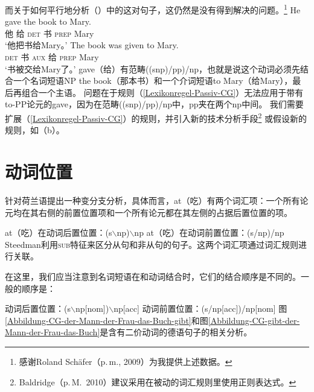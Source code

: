 \noindent
而关于如何平行地分析（）中的这对句子，这仍然是没有得到解决的问题。\footnote{%
  感谢Roland Sch\"{a}fer（p.\,m., 2009）为我提供上述数据。
}
\eal
\ex 
\gll He gave the book to Mary.\\
他 给 \textsc{det} 书 \textsc{prep} Mary\\
\glt `他把书给Mary。'
\ex 
\gll The book was given to Mary.\\
\textsc{det} 书  \textsc{aux} 给 \textsc{prep} Mary\\
\glt `书被交给Mary了。'
\zl
gave（给）有范畴((s\bs np)/pp)/np，也就是说这个动词必须先结合一个名词短语NP the book（那本书）和一个介词短语to Mary（给Mary），最后再组合一个主语。
问题在于规则（\ref{Lexikonregel-Passiv-CG}）无法应用于带有to-PP论元的gave，因为在范畴((s\bs np)/pp)/np中，pp夹在两个np中间。
我们需要扩展（\ref{Lexikonregel-Passiv-CG}）的规则，并引入新的技术分析手段\footnote{%
  Baldridge（p.\,M.\ 2010）建议采用在被动的词汇规则里使用正则表达式。
 }
或假设新的规则，如（b）。

\section{动词位置}
\label{sec-Verbstellung-CG-Steedman}

\mbox{}\citet[]{Steedman2000a-u}
针对荷兰语提出一种变分支分析，具体而言，at（吃）有两个词汇项：一个所有论元均在其右侧的前置位置项和一个所有论元都在其左侧的占据后置位置的项。

\eal
\ex at（吃）在动词后置位置：(s$\backslash$np)$\backslash$np
\ex at（吃）在动词前置位置：(s/np)/np
\zl
Steedman利用\textsc{sub}特征来区分从句和非从句的句子。这两个词汇项通过词汇规则进行关联。

在这里，我们应当注意到名词短语在和动词结合时，它们的结合顺序是不同的。一般的顺序是：

\eal
\label{CG-Verbbewegung}
\ex 动词后置位置：(s$\backslash$np[nom])$\backslash$np[acc]
\ex 动词前置位置：(s/np[acc])/np[nom]
\zl
图\ref{Abbildung-CG-der-Mann-der-Frau-das-Buch-gibt}和图\ref{Abbildung-CG-gibt-der-Mann-der-Frau-das-Buch}是含有二价动词的德语句子的相关分析。

